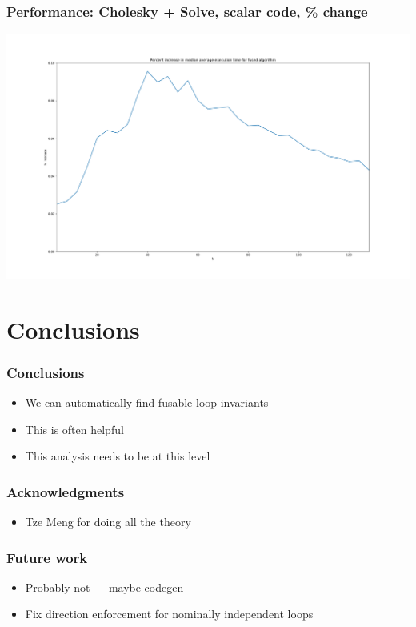 \documentclass{beamer}
\begin{document}
\begin{frame}
  \frametitle{Performance: Cholesky + Solve, scalar code, \% change}
   \includegraphics[height=0.95\textheight, trim={2cm 0 2cm 0}, clip]{../experiments/benchmarks_chol_trsm_small_mats_more_points_1_perc_change}
\end{frame}

\section{Conclusions}

\begin{frame}
  \frametitle{Conclusions}
  \begin{itemize}
  \item We can automatically find fusable loop invariants
  \item This is often helpful
  \item This analysis needs to be at this level
  \end{itemize}
\end{frame}

\begin{frame}
  \frametitle{Acknowledgments}
  \begin{itemize}
  \item Tze Meng for doing all the theory
  \end{itemize}
\end{frame}

\begin{frame}
  \frametitle{Future work}
  \begin{itemize}
  \item Probably not --- maybe codegen
  \item Fix direction enforcement for nominally independent loops
  \end{itemize}
\end{frame}
\end{document}
